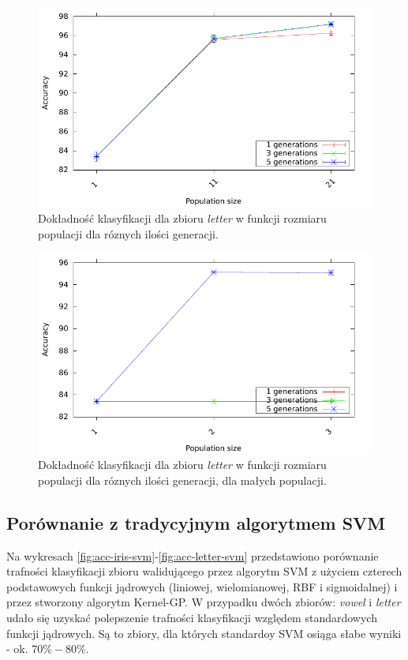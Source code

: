 	
		\begin{figure}
		\includegraphics[scale=0.90]{figures/accuracy/accuracy-letter}
		\caption{Dokładność klasyfikacji dla zbioru \emph{letter} w funkcji rozmiaru populacji dla róznych ilości generacji.\label{fig:acc-letter}}
	\end{figure}
	
		
	\begin{figure}
		\includegraphics[scale=0.90]{figures/accuracy/accuracy-letter-detailed}
		\caption{Dokładność klasyfikacji dla zbioru \emph{letter} w funkcji rozmiaru populacji dla róznych ilości generacji, dla małych populacji.\label{fig:acc-letter-detailed}}
	\end{figure}
	
	
	\FloatBarrier
		
	\subsection{Porównanie z tradycyjnym algorytmem SVM}
	Na wykresach \ref{fig:acc-iris-svm}-\ref{fig:acc-letter-svm} przedstawiono porównanie trafności klasyfikacji zbioru walidującego przez algorytm SVM z użyciem czterech podstawowych funkcji jądrowych (liniowej, wielomianowej, RBF i sigmoidalnej) i przez stworzony algorytm Kernel-GP.
	W przypadku dwóch zbiorów: \emph{vowel} i \emph{letter} udało się uzyskać polepszenie trafności klasyfikacji względem standardowych funkcji jądrowych. Są to zbiory, dla których standardoy SVM osiąga słabe wyniki - ok. $ 70\% - 80\% $. 

